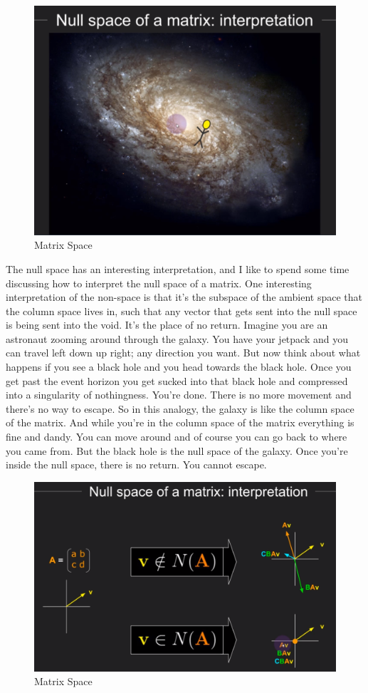 \documentclass[fleqn,10pt]{olplainarticle}
\theoremstyle{definition}
\theoremstyle{remark}
\begin{document}
\begin{figure}[ht]
	\centering
	\includegraphics[width=0.5\linewidth]{images/matrix-space-24.png}
	\caption{Matrix Space}
	\label{fig:matrix_space_24}
\end{figure}

The null space has an interesting interpretation, and I like to spend some time discussing how to interpret the null space of a matrix. One interesting interpretation of the non-space is that it's the subspace of the ambient space that the column space lives in, such that any vector that gets sent into the null space is being sent into the void. It's the place of no return. Imagine you are an astronaut zooming around through the galaxy. You have your jetpack and you can travel left down up right; any direction you want. But now think about what happens if you see a black hole and you head towards the black hole. Once you get past the event horizon you get sucked into that black hole and compressed into a singularity of nothingness. You're done. There is no more movement and there's no way to escape. So in this analogy, the galaxy is like the column space of the matrix. And while you're in the column space of the matrix everything is fine and dandy. You can move around and of course you can go back to where you came from. But the black hole is the null space of the galaxy. Once you're inside the null space, there is no return. You cannot escape.

\begin{figure}[ht]
	\centering
	\includegraphics[width=0.5\linewidth]{images/matrix-space-25.png}
	\caption{Matrix Space}
	\label{fig:matrix_space_25}
\end{figure}
\end{document}
